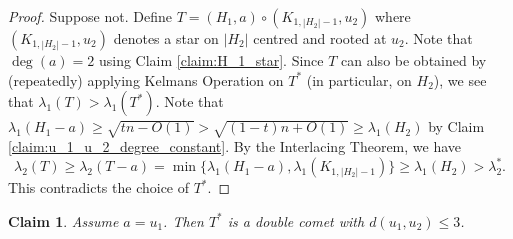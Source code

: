 \documentclass[11pt]{article}
\theoremstyle{plain}
\newtheorem{claim}{Claim}[section]
\numberwithin{equation}{section}
\begin{document}
\begin{proof}
    Suppose not. Define $T = (H_1, a)\circ (K_{1, {|H_2|-1}},u_2)$ where $(K_{1, {|H_2|-1}},u_2)$ denotes a star on $|H_2|$ centred and rooted at $u_2$. Note that $\deg(a)=2$ using Claim \ref{claim:H_1_star}. Since $T$ can also be obtained by (repeatedly) applying Kelmans Operation on $T^*$ (in particular, on $H_2$), we see that $\lambda_1(T)>\lambda_1(T^*)$.
    Note that $\lambda_1(H_1-a) \ge \sqrt{tn-O(1)} > \sqrt{(1-t)n+O(1)} \ge \lambda_1(H_2)$ by Claim \ref{claim:u_1_u_2_degree_constant}. By the Interlacing Theorem, we have
    \[\lambda_2(T)\ge \lambda_2(T-a) = \min\{\lambda_1(H_1-a), \lambda_1(K_{1, {|H_2|-1}})\} \ge  \lambda_1(H_2)> \lambda_2^*.\]  
    This contradicts the choice of $T^*$. 
\end{proof}

\begin{claim}\label{claim:a_u1} Assume $a=u_1$. Then $T^*$ is a double comet with $d(u_1, u_2)\le 3$.  
\end{claim}
\end{document}
